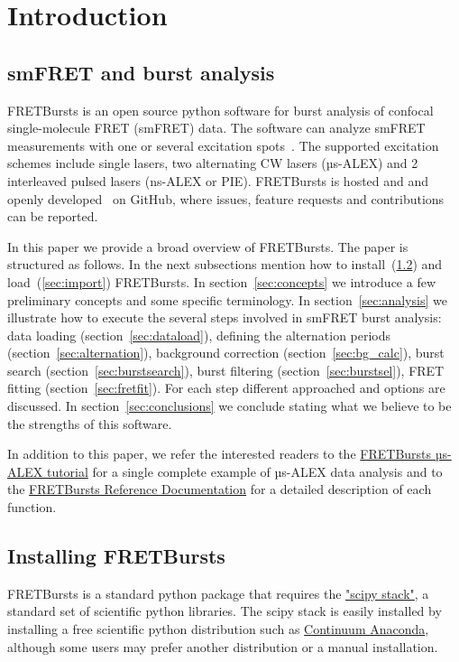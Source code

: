 \section{Introduction}

\subsection{smFRET and burst analysis}

FRETBursts is an open source python software for burst analysis of confocal 
single-molecule FRET (smFRET) data. The software can analyze smFRET measurements
with one or several excitation spots~\cite{Ingargiola_2013}. The supported 
excitation schemes include single lasers, two alternating CW lasers (µs-ALEX\cite{Kapanidis_2005}) 
and 2 interleaved pulsed lasers (ns-ALEX or PIE\cite{M_ller_2005}). 
FRETBursts is hosted and and openly developed~\cite{Prli__2012} on GitHub, where
issues, feature requests and contributions can be reported.

In this paper we provide a broad overview of FRETBursts. 
The paper is structured as follows. 
In the next subsections mention how to install~(\ref{sec:install}) and 
load~(\ref{sec:import}) FRETBursts.
In section~\ref{sec:concepts} we
introduce a few preliminary concepts and some specific terminology.
In section~\ref{sec:analysis} we illustrate how to execute the several steps involved
in smFRET burst analysis: data loading (section~\ref{sec:dataload}), defining the 
alternation periods (section~\ref{sec:alternation}), background 
correction (section~\ref{sec:bg_calc}), burst search (section~\ref{sec:burstsearch}), 
burst filtering (section~\ref{sec:burstsel}), FRET fitting (section~\ref{sec:fretfit}). 
For each step different approached and options are discussed. 
In section~\ref{sec:conclusions} we conclude stating what we believe to be
the strengths of this software.

In addition to this paper, we refer the interested readers to the 
\href{http://nbviewer.ipython.org/github/tritemio/FRETBursts_notebooks/blob/master/notebooks/FRETBursts\%20-\%20us-ALEX\%20smFRET\%20burst\%20analysis.ipynb}{FRETBursts µs-ALEX tutorial} 
for a single complete example of µs-ALEX data analysis and to the
\href{http://fretbursts.readthedocs.org/}{FRETBursts Reference Documentation}
for a detailed description of each function.

\subsection{Installing FRETBursts}
\label{sec:install}
FRETBursts is a standard python package that requires the 
\href{http://www.scipy.org/stackspec.html}{"scipy stack"}, a 
standard set of scientific python libraries.
The scipy stack is easily installed by installing a free scientific python
distribution such as \href{https://store.continuum.io/cshop/anaconda/}{Continuum Anaconda}, 
although some users may prefer another distribution or a manual installation.

